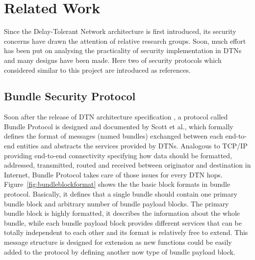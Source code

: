 \chapter{Related Work}
Since the Delay-Tolerant Network architecture is first introduced, its security concerns have drawn the attention of relative research groups. Soon, much effort has been put on analysing the practicality of security implementation in DTNs and many designs have been made. Here two of security protocols which considered similar to this project are introduced as references.
\section{Bundle Security Protocol \cite{Symington}}
Soon after the release of DTN architecture specification \cite{Cerf}, a protocol called Bundle Protocol \cite{Scottrfc} is designed and documented by Scott et al., which formally defines the format of messages (named bundles) exchanged between each end-to-end entities and abstracts the services provided by DTNs. Analogous to TCP/IP providing end-to-end connectivity specifying how data should be formatted, addressed, transmitted, routed and received between originator and destination in Internet, Bundle Protocol takes care of those issues for every DTN hops. Figure~\ref{fig:bundleblockformat} shows the the basic block formats in bundle protocol. Basically, it defines that a single bundle should contain one primary bundle block and arbitrary number of bundle payload blocks. The primary bundle block is highly formatted, it describes the information about the whole bundle,  while each bundle payload block provides different services that can be totally independent to each other and its format is relatively free to extend. This message structure is designed for extension as new functions could be easily added to the protocol by defining another now type of bundle payload block.

